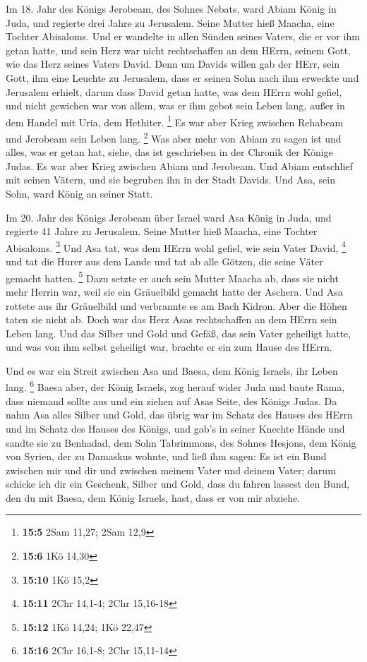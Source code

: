  Im 18. Jahr des Königs Jerobeam, des Sohnes Nebats, ward
Abiam König in Juda,  und regierte drei Jahre zu Jerusalem.
Seine Mutter hieß Maacha, eine Tochter Abisaloms.  Und er
wandelte in allen Sünden seines Vaters, die er vor ihm getan hatte, und
sein Herz war nicht rechtschaffen an dem HErrn, seinem Gott, wie das
Herz seines Vaters David.  Denn um Davids willen gab der
HErr, sein Gott, ihm eine Leuchte zu Jerusalem, dass er seinen Sohn nach
ihm erweckte und Jerusalem erhielt,  darum dass David getan
hatte, was dem HErrn wohl gefiel, und nicht gewichen war von allem, was
er ihm gebot sein Leben lang, außer in dem Handel mit Uria, dem
Hethiter. \footnote{\textbf{15:5} 2Sam 11,27; 2Sam 12,9}  Es
war aber Krieg zwischen Rehabeam und Jerobeam sein Leben lang.
\footnote{\textbf{15:6} 1Kö 14,30}  Was aber mehr von Abiam
zu sagen ist und alles, was er getan hat, siehe, das ist geschrieben in
der Chronik der Könige Judas. Es war aber Krieg zwischen Abiam und
Jerobeam.  Und Abiam entschlief mit seinen Vätern, und sie
begruben ihn in der Stadt Davids. Und Asa, sein Sohn, ward König an
seiner Statt.

 Im 20. Jahr des Königs Jerobeam über Israel ward Asa König
in Juda,  und regierte 41 Jahre zu Jerusalem. Seine Mutter
hieß Maacha, eine Tochter Abisaloms. \footnote{\textbf{15:10} 1Kö 15,2}
 Und Asa tat, was dem HErrn wohl gefiel, wie sein Vater
David, \footnote{\textbf{15:11} 2Chr 14,1-4; 2Chr 15,16-18}
 und tat die Hurer aus dem Lande und tat ab alle Götzen,
die seine Väter gemacht hatten. \footnote{\textbf{15:12} 1Kö 14,24; 1Kö
  22,47}  Dazu setzte er auch sein Mutter Maacha ab, dass
sie nicht mehr Herrin war, weil sie ein Gräuelbild gemacht hatte der
Aschera. Und Asa rottete aus ihr Gräuelbild und verbrannte es am Bach
Kidron.  Aber die Höhen taten sie nicht ab. Doch war das
Herz Asas rechtschaffen an dem HErrn sein Leben lang.  Und
das Silber und Gold und Gefäß, das sein Vater geheiligt hatte, und was
von ihm selbst geheiligt war, brachte er ein zum Hause des HErrn.

 Und es war ein Streit zwischen Asa und Baesa, dem König
Israels, ihr Leben lang. \footnote{\textbf{15:16} 2Chr 16,1-8; 2Chr
  15,11-14}  Baesa aber, der König Israels, zog herauf
wider Juda und baute Rama, dass niemand sollte aus und ein ziehen auf
Asas Seite, des Königs Judas.  Da nahm Asa alles Silber und
Gold, das übrig war im Schatz des Hauses des HErrn und im Schatz des
Hauses des Königs, und gab's in seiner Knechte Hände und sandte sie zu
Benhadad, dem Sohn Tabrimmons, des Sohnes Hesjons, dem König von Syrien,
der zu Damaskus wohnte, und ließ ihm sagen:  Es ist ein
Bund zwischen mir und dir und zwischen meinem Vater und deinem Vater;
darum schicke ich dir ein Geschenk, Silber und Gold, dass du fahren
lassest den Bund, den du mit Baesa, dem König Israels, hast, dass er von
mir abziehe.

